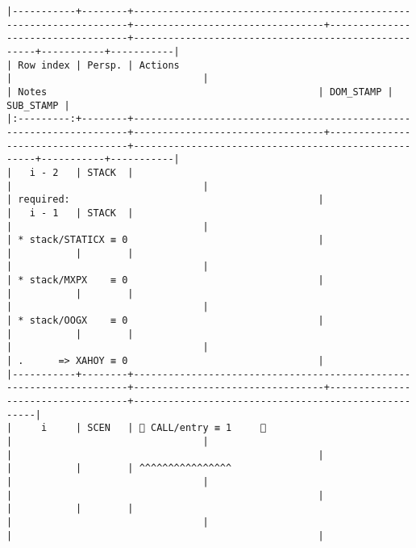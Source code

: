 \documentclass[varwidth=\maxdimen,margin=0.5cm,multi={verbatim}]{standalone}
\begin{document}
\begin{verbatim}
|-----------+--------+---------------------------------------------------------------------+---------------------------------+-----------------------------------+-----------------------------------------------------+-----------+-----------|
| Row index | Persp. | Actions                                                             |                                 |                                   | Notes                                               | DOM_STAMP | SUB_STAMP |
|:---------:+--------+---------------------------------------------------------------------+---------------------------------+-----------------------------------+-----------------------------------------------------+-----------+-----------|
|   i - 2   | STACK  |                                                                     |                                 |                                   | required:                                           |
|   i - 1   | STACK  |                                                                     |                                 |                                   | * stack/STATICX ≡ 0                                 |
|           |        |                                                                     |                                 |                                   | * stack/MXPX    ≡ 0                                 |
|           |        |                                                                     |                                 |                                   | * stack/OOGX    ≡ 0                                 |
|           |        |                                                                     |                                 |                                   | .      => XAHOY ≡ 0                                 |
|-----------+--------+---------------------------------------------------------------------+---------------------------------+-----------------------------------+-----------------------------------------------------|
|     i     | SCEN   |  CALL/entry ≡ 1     👋                                             |                                 |                                   |                                                     |
|           |        | ^^^^^^^^^^^^^^^^                                                    |                                 |                                   |                                                     |
|           |        |                                                                     |                                 |                                   |                                                     |

\end{verbatim}
\end{document}
